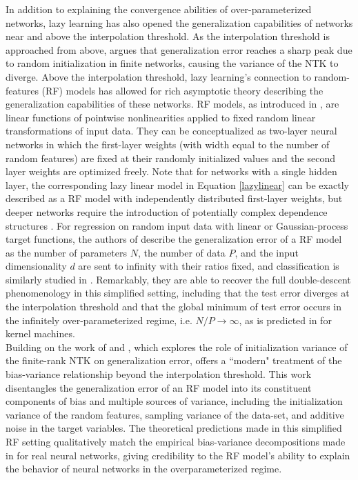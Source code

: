 \documentclass[11pt]{article}
\begin{document}
In addition to explaining the convergence abilities of over-parameterized networks, lazy learning has also opened the generalization capabilities of networks near and above the interpolation threshold. As the interpolation threshold is approached from above, \cite{geigerScalingDescriptionGeneralization2019} argues that generalization error reaches a sharp peak due to random initialization in finite networks, causing the variance of the NTK to diverge. Above the interpolation threshold, lazy learning's connection to random-features (RF) models has allowed for rich asymptotic theory describing the generalization capabilities of these networks. RF models, as introduced in \cite{rahimiRandomFeaturesLargeScale2008}, are linear functions of pointwise nonlinearities applied to fixed random linear transformations of input data. They can be conceptualized as two-layer neural networks in which the first-layer weights (with width equal to the number of random features) are fixed at their randomly initialized values and the second layer weights are optimized freely. Note that for networks with a single hidden layer, the corresponding lazy linear model in Equation \eqref{lazylinear} can be exactly described as a RF model with independently distributed first-layer weights, but deeper networks require the introduction of potentially complex dependence structures \cite{chizatLazyTrainingDifferentiable2020}. For regression on random input data with linear or Gaussian-process target functions, the authors of \cite{meiGeneralizationErrorRandom2019} describe the generalization error of a RF model as the number of parameters $N$, the number of data $P$, and the input dimensionality $d$ are sent to infinity with their ratios fixed, and classification is similarly studied in \cite{dengModelDoubleDescent2020}. Remarkably, they are able to recover the full double-descent phenomenology in this simplified setting, including that the test error diverges at the interpolation threshold and that the global minimum of test error occurs in the infinitely over-parameterized regime, i.e. $N/P\rightarrow\infty$, as is predicted in \cite{belkinReconcilingModernMachine2019,belkinUnderstandDeepLearning2018} for kernel machines.\\

Building on the work of \cite{meiGeneralizationErrorRandom2019} and \cite{ geigerScalingDescriptionGeneralization2019}, which explores the role of initialization variance of the finite-rank NTK on generalization error, \cite{dascoliDoubleTroubleDouble2020} offers a ``modern" treatment of the bias-variance relationship beyond the interpolation threshold. This work disentangles the generalization error of an RF model into its constituent components of bias and multiple sources of variance, including the initialization variance of the random features, sampling variance of the data-set, and additive noise in the target variables. The theoretical predictions made in this simplified RF setting qualitatively match the empirical bias-variance decompositions made in \cite{nealModernTakeBiasVariance2019} for real neural networks, giving credibility to the RF model's ability to explain the behavior of neural networks in the overparameterized regime.
\end{document}
